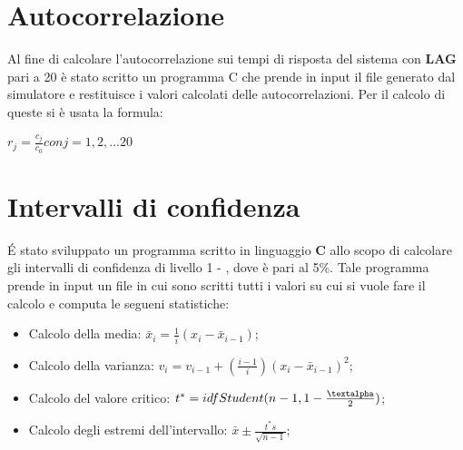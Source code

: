 \section{Autocorrelazione}
Al fine di calcolare l'autocorrelazione sui tempi di risposta del sistema con \textbf{LAG} pari a 20 è stato scritto un programma C che prende in input il file generato dal simulatore e restituisce i valori calcolati delle autocorrelazioni. Per il calcolo di queste si è usata la formula:

\vspace{0.5cm}
\begin{center} $r_{j} = \frac{c_{j}}{c_{0}} con j = 1,2,...20$\end{center}

\section{Intervalli di confidenza}
\'E stato sviluppato un programma scritto in linguaggio \textbf{C} allo scopo di calcolare gli intervalli di confidenza di livello 1 - \textalpha, dove \textalpha è pari al 5\%. Tale programma prende in input un file in cui sono scritti tutti i valori su cui si vuole fare il calcolo e computa le segueni statistiche:
\begin{itemize}
 \item Calcolo della media: $\bar{x}_{i} = \frac{1}{i}(x_{i} - \bar{x}_{i-1})$;
 \item Calcolo della varianza: $v_{i} = v_{i-1} + (\frac{i-1}{i}){(x_{i} - \bar{x}_{i-1})}^{2}$;
 \item Calcolo del valore critico: $t^{*} = idfStudent(n-1, 1-\frac{\textalpha}{2})$;
 \item Calcolo degli estremi dell'intervallo: $\bar{x} \pm \frac{t^{*}s}{\sqrt{n-1}}$;
\end{itemize}